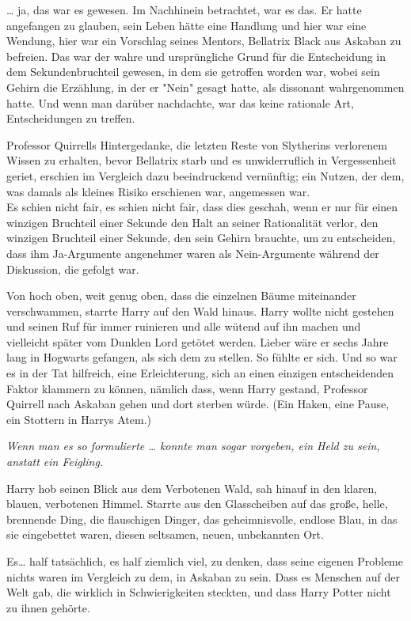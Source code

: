 {… ja, das war es gewesen. Im Nachhinein betrachtet, war es das. Er hatte angefangen zu glauben, sein Leben hätte eine Handlung und hier war eine Wendung, hier war ein Vorschlag seines Mentors, Bellatrix Black aus Askaban zu befreien. Das war der wahre und ursprüngliche Grund für die Entscheidung in dem Sekundenbruchteil gewesen, in dem sie getroffen worden war, wobei sein Gehirn die Erzählung, in der er "Nein" gesagt hatte, als dissonant wahrgenommen hatte. Und wenn man darüber nachdachte, war das keine rationale Art, Entscheidungen zu treffen.

Professor Quirrells Hintergedanke, die letzten Reste von Slytherins verlorenem Wissen zu erhalten, bevor Bellatrix starb und es unwiderruflich in Vergessenheit geriet, erschien im Vergleich dazu beeindruckend vernünftig; ein Nutzen, der dem, was damals als kleines Risiko erschienen war, angemessen war.\\ Es schien nicht fair, es schien nicht fair, dass dies geschah, wenn er nur für einen winzigen Bruchteil einer Sekunde den Halt an seiner Rationalität verlor, den winzigen Bruchteil einer Sekunde, den sein Gehirn brauchte, um zu entscheiden, dass ihm Ja-Argumente angenehmer waren als Nein-Argumente während der Diskussion, die gefolgt war.

Von hoch oben, weit genug oben, dass die einzelnen Bäume miteinander verschwammen, starrte Harry auf den Wald hinaus. Harry wollte nicht gestehen und seinen Ruf für immer ruinieren und alle wütend auf ihn machen und vielleicht später vom Dunklen Lord getötet werden. Lieber wäre er sechs Jahre lang in Hogwarts gefangen, als sich dem zu stellen. So fühlte er sich. Und so war es in der Tat hilfreich, eine Erleichterung, sich an einen einzigen entscheidenden Faktor klammern zu können, nämlich dass, wenn Harry gestand, Professor Quirrell nach Askaban gehen und dort sterben würde. (Ein Haken, eine Pause, ein Stottern in Harrys Atem.)

\emph{Wenn man es so formulierte … konnte man sogar vorgeben, ein Held zu sein, anstatt ein Feigling.}

Harry hob seinen Blick aus dem Verbotenen Wald, sah hinauf in den klaren, blauen, verbotenen Himmel. Starrte aus den Glasscheiben auf das große, helle, brennende Ding, die flauschigen Dinger, das geheimnisvolle, endlose Blau, in das sie eingebettet waren, diesen seltsamen, neuen, unbekannten Ort.

Es… half tatsächlich, es half ziemlich viel, zu denken, dass seine eigenen Probleme nichts waren im Vergleich zu dem, in Askaban zu sein. Dass es Menschen auf der Welt gab, die wirklich in Schwierigkeiten steckten, und dass Harry Potter nicht zu ihnen gehörte.

}
